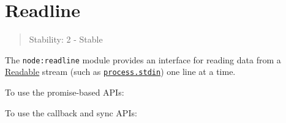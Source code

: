 \section{Readline}\label{readline}

\begin{quote}
Stability: 2 - Stable
\end{quote}

The \texttt{node:readline} module provides an interface for reading data
from a \href{stream.md\#readable-streams}{Readable} stream (such as
\href{process.md\#processstdin}{\texttt{process.stdin}}) one line at a
time.

To use the promise-based APIs:

\begin{Shaded}
\begin{Highlighting}[]
 \OperatorTok{*}  \OperatorTok{;}
\end{Highlighting}
\end{Shaded}

\begin{Shaded}
\begin{Highlighting}[]
\OperatorTok{=} \NormalTok{(}\NormalTok{)}\OperatorTok{;}
\end{Highlighting}
\end{Shaded}

To use the callback and sync APIs:

\begin{Shaded}
\begin{Highlighting}[]
 \OperatorTok{*}  \OperatorTok{;}
\end{Highlighting}
\end{Shaded}

\begin{Shaded}
\begin{Highlighting}[]
\OperatorTok{=} \NormalTok{(}\NormalTok{)}\OperatorTok{;}
\end{Highlighting}
\end{Shaded}

